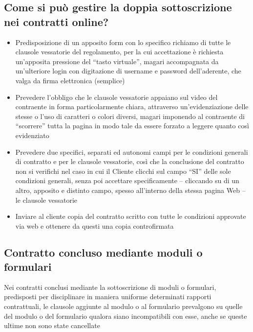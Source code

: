 \subsection{Come si può gestire la doppia sottoscrizione nei contratti online?}
\begin{itemize}
    \item Predisposizione di un apposito form con lo specifico richiamo di tutte le clausole vessatorie del regolamento, per la cui accettazione è richiesta un’apposita pressione del “tasto virtuale”, magari accompagnata da un’ulteriore login con digitazione di username e password dell’aderente, che valga da firma elettronica (semplice)
    \item Prevedere l’obbligo che le clausole vessatorie appaiano sul video del contraente in forma particolarmente chiara, attraverso un’evidenziazione delle stesse o l’uso di caratteri o colori diversi, magari imponendo al contraente di “scorrere” tutta la pagina in modo tale da essere forzato a leggere quanto così evidenziato
    \item Prevedere due specifici, separati ed autonomi campi per le condizioni generali di contratto e per le clausole vessatorie, così che la conclusione del contratto non si verifichi nel caso in cui il Cliente clicchi sul campo “SI” delle sole condizioni generali, senza poi accettare specificamente – cliccando su di un altro, apposito e distinto campo, spesso all’interno della stessa pagina Web – le clausole vessatorie
    \item Inviare al cliente copia del contratto scritto con tutte le condizioni approvate via web e ottenere da questi una copia controfirmata
\end{itemize}

\subsection{Contratto concluso mediante moduli o formulari}
Nei contratti conclusi mediante la sottoscrizione di moduli o formulari, predisposti per disciplinare in maniera uniforme determinati
rapporti contrattuali, le clausole aggiunte al modulo o al formulario prevalgono su quelle del modulo o del formulario qualora siano
incompatibili con esse, anche se queste ultime non sono state cancellate

